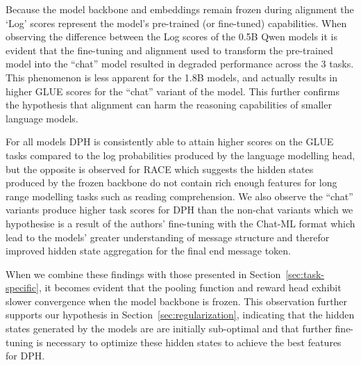 Because the model backbone and embeddings remain frozen during alignment the `Log' scores represent the model's pre-trained (or fine-tuned) capabilities. When observing the difference between the Log scores of the 0.5B Qwen models it is evident that the fine-tuning and alignment used to transform the pre-trained model into the ``chat'' model resulted in degraded performance across the 3 tasks. This phenomenon is less apparent for the 1.8B models, and actually results in higher GLUE scores for the ``chat'' variant of the model. This further confirms the hypothesis that alignment can harm the reasoning capabilities of smaller language models.

\begingroup
\vspace{-6pt}
\setlength{\tabcolsep}{9pt}
\setlength{\extrarowheight}{3pt}
\begin{table}[ht]
\centering
\caption{Comparison of validation scores calculated using the log probabilities from the vanilla model checkpoints and reward scores produced by the trained Direct Preference Heads.}
\label{tab:qwen-table}
\vspace*{-.5\baselineskip}
\end{table}
\endgroup

For all models DPH is consistently able to attain higher scores on the GLUE tasks compared to the log probabilities produced by the language modelling head, but the opposite is observed for RACE which suggests the hidden states produced by the frozen backbone do not contain rich enough features for long range modelling tasks such as reading comprehension. We also observe the ``chat'' variants produce higher task scores for DPH than the non-chat variants which we hypothesise is a result of the authors' fine-tuning with the Chat-ML format which lead to the models' greater understanding of message structure and therefor improved hidden state aggregation for the final end message token.

When we combine these findings with those presented in Section~\ref{sec:task-specific}, it becomes evident that the pooling function and reward head exhibit slower convergence when the model backbone is frozen. This observation further supports our hypothesis in Section~\ref{sec:regularization}, indicating that the hidden states generated by the models are are initially sub-optimal and that further fine-tuning is necessary to optimize these hidden states to achieve the best features for DPH.